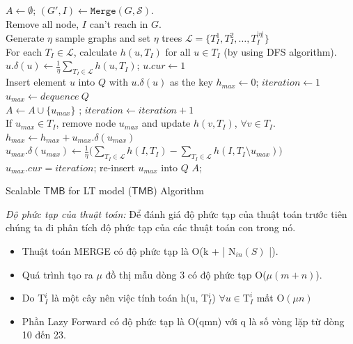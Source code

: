 \begin{algorithm}[H]
$A \leftarrow \emptyset$;	$(G', I) \leftarrow \mathtt{Merge}(G, \mathcal{S})$.
\\
Remove all node, $I$ can't reach in $G$.
\\
Generate $\eta$ sample graphs and set $\eta$ trees $\mathcal{L}=\{T_{I}^1, T_{I}^2, \ldots, T_{I}^{|\mathcal{\eta}|}\}$
\\
For each $ T_{I} \in \mathcal{L}$, calculate $h(u, T_{I})$ for all $u \in T_{I}$ (by using DFS algorithm).
\\
{
	$u.\delta(u) \leftarrow \frac{1}{\eta}\sum_{T_{I} \in \mathcal{L}} h(u, T_{I})$; $u. cur \leftarrow 1$
	\\
	Insert element $u$ into $Q$ with $u.\delta(u)$ as the key
}
$ h_{max} \leftarrow 0$; $iteration \leftarrow 1$
\\
{
	$u_{max} \leftarrow  dequence \  Q$
	\\
	{
		$A \leftarrow A \cup \{u_{max}\}$ ; $iteration \leftarrow iteration+1 $
		\\
		{
			If $u_{max} \in T_{I}$, remove node $u_{max}$ and update $h(v, T_{I})$, $ \forall v \in T_{I}$.
		}
		$h_{max} \leftarrow h_{max}+ u_{max}.\delta(u_{max})$
	}
	{
		$u_{max}. \delta(u_{max}) \leftarrow  \frac{1}{\eta}\big(\sum_{T_{I} \in \mathcal{L}}h(I, T_{I}) - \sum_{T_{I} \in \mathcal{L}} h(I, T_{I} \setminus u_{max})\big)$
		\\
		$u_{max}. cur =iteration$; re-insert $u_{max}$ into $Q$
	}
}
\Return $A$;
\caption{Scalable $\mathsf{TMB}$ for LT model ($\mathsf{TMB}$) Algorithm}
\label{STMB}
\end{algorithm}				
{\itshape Độ phức tạp của thuật toán: }		
Để đánh giá độ phức tạp của thuật toán trước tiên chúng ta đi phân tích độ phức tạp của các thuật toán con trong nó.
\begin {itemize}
\item Thuật toán MERGE có độ phức tạp là O(k + | N$_{in}(S)$ |).

\item Quá trình tạo ra $\mu$ đồ thị mẫu dòng 3 có độ phức tạp O($\mu(m + n)$).

\item Do T$_{I}^i$ là một cây nên việc tính toán h(u, T$_{I}^i$) $\forall u \in \text{T}_{I}^i$ mất O$(\mu n)$ 

\item Phần Lazy Forward có độ phức tạp là O(qmn) với q là số vòng lặp từ dòng 10 đến 23.
\end {itemize}

